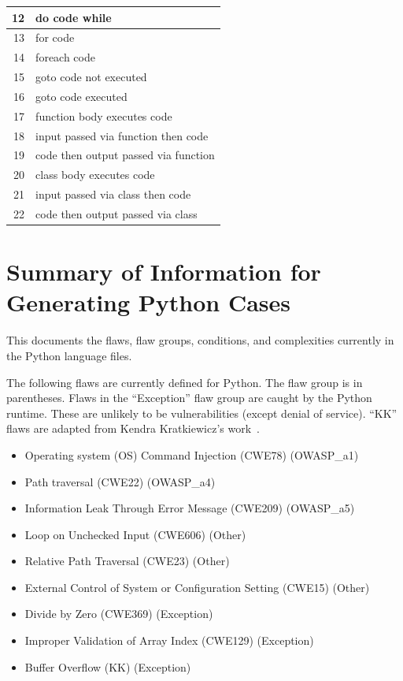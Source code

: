 \begin{appendices}
\begin{table}[H]
\begin{tabular}{|r|l|}
12 & do code while \\
\hline
13 & for code \\
\hline
14 & foreach code \\
\hline
15 & goto code not executed \\
\hline
16 & goto code executed \\
\hline
17 & function body executes code \\
\hline
18 & input passed via function then code \\
\hline
19 & code then output passed via function \\
\hline
20 & class body executes code \\
\hline
21 & input passed via class then code \\
\hline
22 & code then output passed via class \\
\hline
\end{tabular}
\label{tab:complexity IDs for PHP}
\end{table}

\newpage

\section{Summary of Information for Generating Python Cases}
\label{sec:Python language}

This documents the flaws, flaw groups, conditions, and complexities currently in the
Python language files.

The following flaws are currently defined for Python.  The flaw group is in
parentheses.  Flaws in the ``Exception'' flaw group are caught by the Python runtime.
These are unlikely to be vulnerabilities (except denial of service).
``KK'' flaws are adapted from Kendra Kratkiewicz's work~\cite{Kratkiewicz2005}.
\begin{itemize}[nosep]
    \item Operating system (OS) Command Injection (CWE78) (OWASP\_a1)
    \item Path traversal (CWE22) (OWASP\_a4)
    \item Information Leak Through Error Message (CWE209) (OWASP\_a5)
    \item Loop on Unchecked Input (CWE606) (Other)
    \item Relative Path Traversal (CWE23) (Other)
    \item External Control of System or Configuration Setting (CWE15) (Other)
    \item Divide by Zero (CWE369) (Exception)
    \item Improper Validation of Array Index (CWE129) (Exception)
    \item Buffer Overflow (KK) (Exception)
\end{itemize}


\end{appendices}
